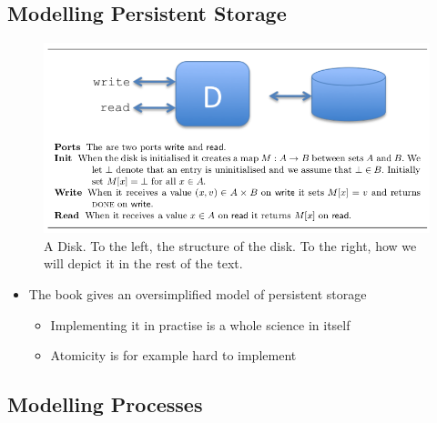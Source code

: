 \documentclass[11pt]{article}
\begin{document}
\subsection{Modelling Persistent Storage}
\label{sec:orgf18f4fa}
\begin{figure}[htbp]
\centering
\includegraphics[width=.9\linewidth]{A Syntax for Distributed Systems (3)/screenshot_2018-09-02_11-00-00.png}
\caption{\label{fig:org8a0042d}
A Disk. To the left, the structure of the disk. To the right, how we will depict it in the rest of the text.}
\end{figure}

\begin{itemize}
\item The book gives an oversimplified model of persistent storage
\begin{itemize}
\item Implementing it in practise is a whole science in itself
\item Atomicity is for example hard to implement
\end{itemize}
\end{itemize}

\subsection{Modelling Processes}
\label{sec:org417a0c0}
\end{document}

